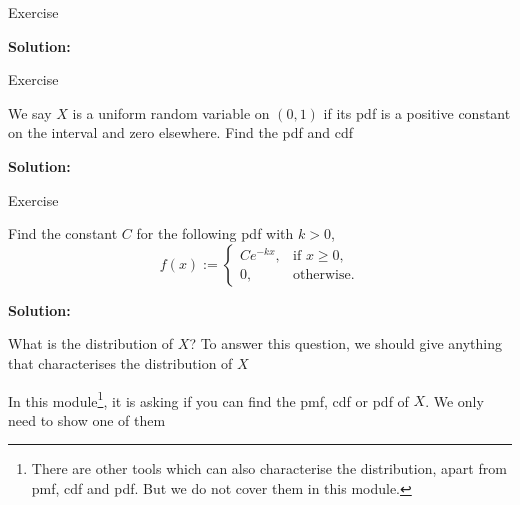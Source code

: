 \documentclass{beamer}
\begin{document}
\begin{frame}{Exercise}

{\bf Solution:}

\end{frame}

\begin{frame}{Exercise}

We say $X$ is a uniform random variable on $(0,1)$ if its pdf is a positive constant on the interval and zero elsewhere. Find the pdf and cdf
 
 
 
{\bf Solution: }

\end{frame}


\begin{frame}{Exercise}

Find the constant $C$ for the following pdf with $k>0$,
$$f(x):=\begin{cases}
Ce^{-kx},&\text{if }x\geq0,\\
0,& \text{otherwise.}
\end{cases}$$



{\bf Solution: }

\end{frame}



\begin{frame}{What is the distribution of $X$?}
To answer this question, we should give anything that characterises the distribution of $X$



In this module\footnote{There are other tools which can also characterise the distribution, apart from pmf, cdf and pdf. But we do not cover them in this module.}, it is asking if you can find the pmf, cdf or pdf of $X$. We only need to show one of them

\end{frame}
\end{document}
